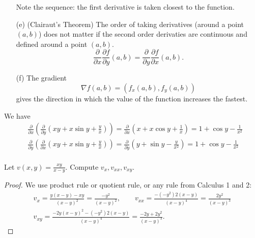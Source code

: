 \begin{definition}
\begin{itemize}
        Note the sequence: the first derivative is taken closest to the function.
        \item[(e)] (Clairaut's Theorem) The order of taking derivatives (around a point $(a,b)$) does not matter if the second order derivaties are continuous and defined around a point $(a,b)$. 
        \begin{equation*}
            \frac{\partial }{\partial x} \frac{\partial f}{\partial y}(a,b) = \frac{\partial }{\partial y} \frac{\partial f}{\partial x}(a,b).
        \end{equation*}
        \item[(f)] The gradient
        \begin{equation*}
            \nabla f(a,b) = \left(f_x(a,b), f_y(a,b)\right)
        \end{equation*}
        gives the direction in which the value of the function increases the fastest.
    \end{itemize}
\end{definition}
\begin{example} We have
    \begin{align*}
        &\frac{\partial}{\partial x} \left(\frac{\partial}{\partial y} \left(xy + x\sin y + \frac{y}{x}\right)\right) =  \frac{\partial}{\partial x} \left(x + x\cos y + \frac{1}{x}\right) = 1 + \cos y -\frac{1}{x^2}\\
        &\frac{\partial}{\partial y} \left(\frac{\partial}{\partial x} \left(xy + x\sin y + \frac{y}{x}\right)\right) =  \frac{\partial}{\partial y} \left(y + \sin y - \frac{y}{x^2}\right) = 1 + \cos y -\frac{1}{x^2}\\
    \end{align*}
\end{example}

\begin{example} Let $v(x,y) = \frac{xy}{x-y}$. Compute $v_x, v_{xx}, v_{xy}$.
\end{example}
\begin{proof} We use product rule or quotient rule, or any rule from Calculus 1 and 2:
\begin{align*}
    v_x = \frac{y(x-y) - xy}{(x-y)^2} = \frac{-y^2}{(x-y)^2}, \qquad v_{xx} = \frac{- (-y^2)2(x-y)}{(x-y)^4} = \frac{2y^2}{(x-y)^3}\\
    v_{xy} = \frac{-2y(x-y)^2 - (-y^2)2(x-y)}{(x-y)^4} = \frac{-2y+2y^2}{(x-y)^3}.
\end{align*}
\end{proof}

